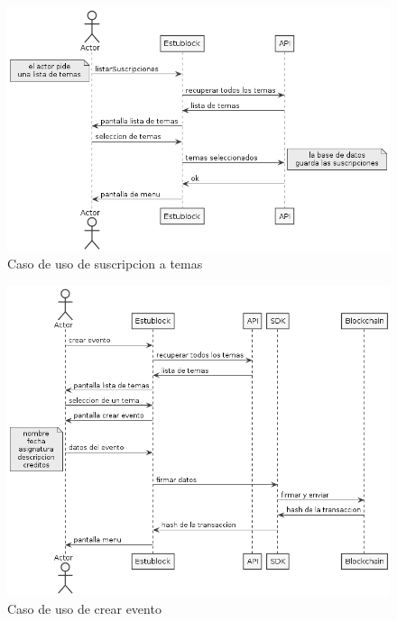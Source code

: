 \begin{figure}[h!]
  \centering
  \includegraphics[width=1\linewidth]{figs/Desarrollo/CasosUso/suscripcionAsignatura}
  \caption[Caso de uso de suscripcion a temas]{Caso de uso de suscripcion a temas}
  \label{fig:casoSuscripciones}
\end{figure}

\begin{figure}[h!]
  \centering
  \includegraphics[width=1\linewidth]{figs/Desarrollo/CasosUso/crearEvento}
  \caption[Caso de uso de crear evento]{Caso de uso de crear evento}
  \label{fig:casoEvento}
\end{figure}

